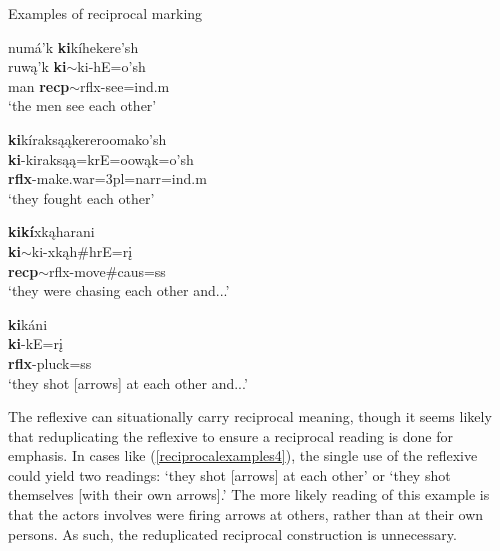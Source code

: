 \begin{exe}
\item\label{reciprocalexamples} Examples of reciprocal marking

	\begin{xlist}
	
	\item\label{reciprocalexamples1} \glll numá'k \textbf{ki}kíhekere'sh\\
	ruwą'k \textbf{ki}$\sim${ki}-hE=o'sh\\
	\textnormal{man} \textbf{recp}$\sim${rflx}-\textnormal{see}=ind.m\\
	\glt 	`the men see each other' \citep[23]{mixco1997a}
	
	\item\label{reciprocalexamples2} \glll \textbf{ki}kíraksąąkereroomako'sh\\
	\textbf{ki}-kiraksąą=krE=oowąk=o'sh\\
	\textbf{rflx}-\textnormal{make.war}=3pl=narr=ind.m\\
	\glt `they fought each other' \citep[40]{hollow1973b}
	
	\item\label{reciprocalexamples3} \glll \textbf{kikí}xkąharani\\
	\textbf{ki}$\sim$ki-xkąh\#hrE=rį\\
	\textbf{recp}$\sim$rflx-\textnormal{move}\#caus=ss\\
	\glt `they were chasing each other and...' \citep[107]{trechter2012b}
	
	\item\label{reciprocalexamples4} \glll \textbf{ki}káni\\
	\textbf{ki}-kE=rį\\
	\textbf{rflx}-\textnormal{pluck}=ss\\
	\glt `they shot [arrows] at each other and...' \citep[116]{trechter2012b}
	
	\end{xlist}

\end{exe}

The reflexive can situationally carry reciprocal meaning, though it seems likely that reduplicating the reflexive to ensure a reciprocal reading is done for emphasis. In cases like (\ref{reciprocalexamples4}), the single use of the reflexive could yield two readings: `they shot [arrows] at each other' or `they shot themselves [with their own arrows].' The more likely reading of this example is that the actors involves were firing arrows at others, rather than at their own persons. As such, the reduplicated reciprocal construction is unnecessary.


